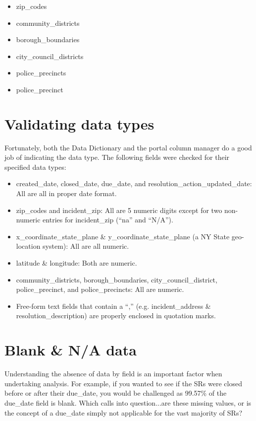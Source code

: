 \documentclass[12pt, titlepage]{article}
\begin{document}
\begin{itemize}
	\item zip\_codes
	\item community\_districts
	\item borough\_boundaries
	\item city\_council\_districts
	\item police\_precincts
	\item police\_precinct 
\end{itemize}	

	
	
	
\section{Validating data types}
\label{sec:datatypes}
Fortunately, both the Data Dictionary and the portal column manager 
do a good job of indicating the data type. The following fields were 
checked for their specified data types:
	
\begin{itemize}
	\item created\_date, closed\_date, due\_date, and resolution\_action\_updated\_date: 
	All are all in proper date format.
	\item zip\_codes and incident\_zip: All are 5 numeric digits except 
	for two non-numeric entries for incident\_zip (``na'' and ``N/A'').
	\item x\_coordinate\_state\_plane \&  y\_coordinate\_state\_plane 
	(a NY State geo-location system): All are all numeric.
	\item latitude \& longitude: Both are numeric.
	\item community\_districts, borough\_boundaries, 
	city\_council\_district, police\_precinct, and police\_precincts: All are numeric.
	\item Free-form text fields that contain a ``,'' (e.g. incident\_address 
	\& resolution\_description) are properly enclosed in quotation marks.
\end{itemize}	

 

\section{Blank \& N/A data}
\label{sec:blanks}
Understanding the absence of data by field is an important factor 
when undertaking analysis. For example, if you wanted to see if the SRs were
closed before or after their due\_date, you would be challenged 
as 99.57\% of the due\_date field is blank. Which calls into 
question...are these missing values, or is the concept of a 
due\_date simply not applicable for the vast majority of SRs?
\end{document}
